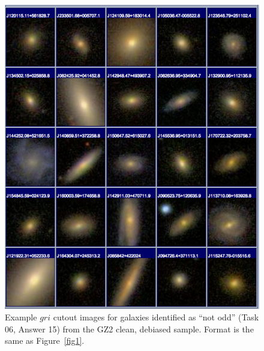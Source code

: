 \documentclass[useAMS,usenatbib]{mn2e}
\begin{document}
\newpage
\clearpage
\begin{figure}
\includegraphics[angle=0,width=7.0in]{figures/gallery/notodd.png}
\caption{Example $gri$ cutout images for galaxies identified as ``not odd'' (Task 06, Answer 15) from the GZ2 clean, debiased sample. Format is the same as Figure~\ref{fig1}.}
\end{figure}
\end{document}
